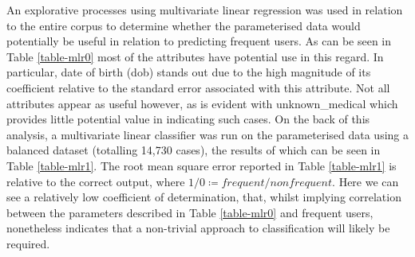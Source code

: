  An explorative processes using multivariate linear regression was used in relation to the entire corpus to determine whether the parameterised data would potentially be useful in relation to predicting frequent users. As can be seen in Table \ref{table-mlr0} most of the attributes have potential use in this regard. In particular, date of birth (dob) stands out due to the high magnitude of its coefficient relative to the standard error associated with this attribute. Not all attributes appear as useful however, as is evident with unknown\_medical which provides little potential value in indicating such cases. On the back of this analysis, a multivariate linear classifier was run on the parameterised data using a balanced dataset (totalling 14,730 cases), the results of which can be seen in Table \ref{table-mlr1}. The root mean square error reported in Table \ref{table-mlr1} is relative to the correct output, where $1/0 \coloneqq frequent / nonfrequent $.  Here we can see a relatively low coefficient of determination, that, whilst implying correlation between the parameters described in Table \ref{table-mlr0} and frequent users, nonetheless indicates that a non-trivial approach to classification will likely be required.
 

